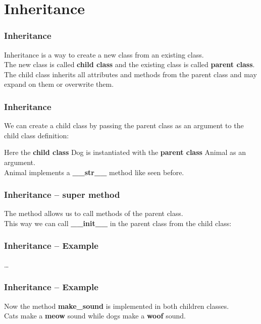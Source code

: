 \documentclass{beamer}
\begin{document}
\section{Inheritance}
\begin{frame}
  \frametitle{Inheritance}
  Inheritance is a way to create a new class from an existing class.\\
  \vspace{5mm}
  The new class is called \textbf{child class} and the existing class is called \textbf{parent class}.\\
  \vspace{5mm}
  The child class inherits all attributes and methods from the parent class and may expand on them or overwrite them.\\
\end{frame}
\begin{frame}
  \frametitle{Inheritance}
  We can create a child class by passing the parent class as an argument to the child class definition: 
  
  Here the \textbf{child class} Dog is instantiated with the \textbf{parent class} Animal as an argument.\\
  
  Animal implements a \textbf{\_\_str\_\_} method like seen before.\\
\end{frame}
\begin{frame}
  \frametitle{Inheritance -- super method}
  The \textbf{} method allows us to call methods of the parent class.\\
  \vspace{5mm}
  This way we can call \textbf{\_\_init\_\_} in the parent class from the child class: \\
  
\end{frame}
\begin{frame}
  \frametitle{Inheritance -- Example}
  \vspace{-10mm}
  
\dots
\end{frame}
\begin{frame}
  \frametitle{Inheritance -- Example}
  \vspace{-10mm}
  
  Now the method \textbf{make\_sound} is implemented in both children classes.\\
  \vspace{5mm} 
  Cats make a \textbf{meow} sound while dogs make a \textbf{woof} sound.\\
\end{frame}
\end{document}
